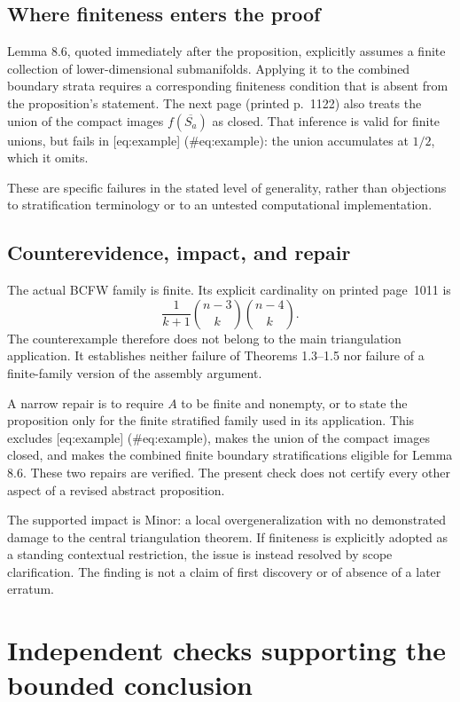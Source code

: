 \documentclass[10pt]{article}
\begin{document}
\subsection*{Where finiteness enters the proof}
Lemma 8.6, quoted immediately after the proposition, explicitly assumes a finite collection of lower-dimensional submanifolds. Applying it to the combined boundary strata requires a corresponding finiteness condition that is absent from the proposition’s statement. The next page (printed p. 1122) also treats the union of the compact images \(f(\overline{S_a})\) as closed. That inference is valid for finite unions, but fails in [eq:example] (\#eq:example): the union accumulates at \(1/2\), which it omits.\par
These are specific failures in the stated level of generality, rather than objections to stratification terminology or to an untested computational implementation.\par
\subsection*{Counterevidence, impact, and repair}
The actual BCFW family is finite. Its explicit cardinality on printed page 1011 is \[\frac1{k+1}\binom{n-3}{k}\binom{n-4}{k}.\] The counterexample therefore does not belong to the main triangulation application. It establishes neither failure of Theorems 1.3–1.5 nor failure of a finite-family version of the assembly argument.\par
A narrow repair is to require \(A\) to be finite and nonempty, or to state the proposition only for the finite stratified family used in its application. This excludes [eq:example] (\#eq:example), makes the union of the compact images closed, and makes the combined finite boundary stratifications eligible for Lemma 8.6. These two repairs are verified. The present check does not certify every other aspect of a revised abstract proposition.\par
The supported impact is Minor: a local overgeneralization with no demonstrated damage to the central triangulation theorem. If finiteness is explicitly adopted as a standing contextual restriction, the issue is instead resolved by scope clarification. The finding is not a claim of first discovery or of absence of a later erratum.\par
\section*{Independent checks supporting the bounded conclusion}
\end{document}

